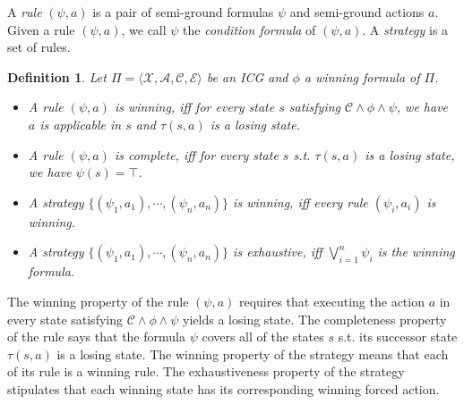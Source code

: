 \documentclass[review]{elsarticle}
\newcommand{\set}[1]{\{ #1 \}}
\newcommand{\tuple}[1]{\langle {#1} \rangle}
\newcommand{\true}{\top}
\newcommand{\statevar}{\mathcal{X}}
\newcommand{\act}{\mathcal{A}}
\newcommand{\constraint}{\mathcal{C}}
\newcommand{\estate}{\mathcal{E}}
\newcommand{\suc}{\tau}
\newtheorem{definition}{Definition}
\begin{document}
	A \textit{rule} $(\psi, a)$ is a pair of semi-ground formulas $\psi$ and semi-ground actions $a$.
	Given a rule $(\psi, a)$, we call $\psi$ the \textit{condition formula} of $(\psi, a)$.
	A \textit{strategy} is a set of rules.
	\begin{definition} \label{def:winRule} \rm
		Let $\Pi = \tuple{\statevar, \act, \constraint, \estate}$ be an ICG and $\phi$ a winning formula of $\Pi$.
		\begin{itemize}
			\item A rule $(\psi, a)$ is \textit{winning}, iff for every state $s$ satisfying $\constraint \land \phi \land \psi$, we have $a$ is applicable in $s$ and $\suc(s, a)$ is a losing state.
			
			\item A rule $(\psi, a)$ is \textit{complete}, iff for every state $s$ s.t. $\suc(s, a)$ is a losing state, we have $\psi(s) = \true$.
			
			\item A strategy $\set{(\psi_1, a_1), \cdots, (\psi_n, a_n) }$ is \textit{winning}, iff every rule $(\psi_i, a_i)$ is winning.
			
			\item A strategy $\set{(\psi_1, a_1), \cdots, (\psi_n, a_n) }$ is \textit{exhaustive}, iff $\bigvee_{i = 1}^n \psi_i$ is the winning formula.
		\end{itemize}
	\end{definition}
	The winning property of the rule $(\psi, a)$ requires that executing the action $a$ in every state satisfying $\constraint \land \phi \land \psi$ yields a losing state.
	The completeness property of the rule says that the formula $\psi$ covers all of the states $s$ s.t. its successor state $\suc(s, a)$ is a losing state.
	The winning property of the strategy means that each of its rule is a winning rule.
	The exhaustiveness property of the strategy stipulates that each winning state has its corresponding winning forced action. %
\end{document}
